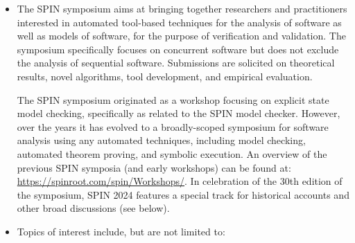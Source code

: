 \documentclass[prodmode,acmtecs]{acmsmall} %
\begin{document}
\begin{itemize}\item  The SPIN symposium aims at bringing together researchers and practitioners interested in automated tool-based techniques for the analysis of software as well as models of software, for the purpose of verification and validation. The symposium specifically focuses on concurrent software but does not exclude the analysis of sequential software. Submissions are solicited on theoretical results, novel algorithms, tool development, and empirical evaluation. 
 
  The SPIN symposium originated as a workshop focusing on explicit state model checking, specifically as related to the SPIN model checker. However, over the years it has evolved to a broadly-scoped symposium for software analysis using any automated techniques, including model checking, automated theorem proving, and symbolic execution. An overview of the previous SPIN symposia (and early workshops) can be found at: \href{https://spinroot.com/spin/Workshops/}{https://spinroot.com/spin/Workshops/}. In celebration of the 30th edition of the symposium, SPIN 2024 features a special track for historical accounts and other broad discussions (see below). 
 
\item  Topics of interest include, but are not limited to: 
 

\end{itemize}
\end{document}
